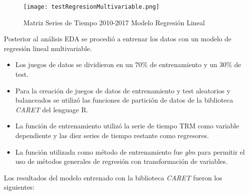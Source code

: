 \begin{figure}[H]
    \centering
    \texttt{[image: testRegresionMultivariable.png]}
    \caption{Matriz Series de Tiempo 2010-2017 Modelo Regresión Lineal}
\end{figure}

Posterior al análisis EDA se procedió a entrenar los datos con un modelo de regresión lineal multivariable.

\begin{itemize}
  \item Los juegos de datos se dividieron en un 70\% de entrenamiento y un 30\% de test.
  \item Para la creación de juegos de datos de entrenamiento y test aleatorios y balanceados se utilizó las funciones de partición de datos de la biblioteca \emph{CARET} del lenguage R.
  \item La función de entrenamiento utilizó la serie de tiempo TRM como variable dependiente y las diez series de tiempo restante como regresores.
  \item La función utilizada como método de entrenamiento fue \emph{glm} para permitir el uso de métodos generales de regresión con transformación de variables.
\end{itemize}

Los resultados del modelo entrenado con la biblioteca \emph{CARET} fueron los siguientes:

